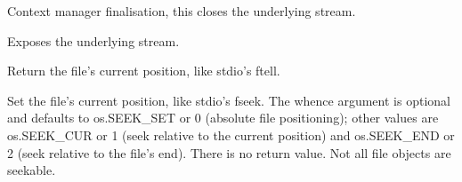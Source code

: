\documentclass[letterpaper,10pt,english]{sphinxmanual}
\begin{document}
\begin{fulllineitems}
\begin{fulllineitems}
\end{fulllineitems}


\begin{fulllineitems}
\label{\detokenize{ref/LIS/core/RawStream:TotalDepth.LIS.core.RawStream.RawStream.__exit__}}
Context manager finalisation, this closes the underlying stream.

\end{fulllineitems}


\begin{fulllineitems}
\label{\detokenize{ref/LIS/core/RawStream:TotalDepth.LIS.core.RawStream.RawStream.stream}}
Exposes the underlying stream.

\end{fulllineitems}


\begin{fulllineitems}
\label{\detokenize{ref/LIS/core/RawStream:TotalDepth.LIS.core.RawStream.RawStream.tell}}
Return the file’s current position, like stdio’s ftell.

\end{fulllineitems}


\begin{fulllineitems}
\label{\detokenize{ref/LIS/core/RawStream:TotalDepth.LIS.core.RawStream.RawStream.seek}}
Set the file’s current position, like stdio’s fseek. The whence
argument is optional and defaults to os.SEEK\_SET or 0 (absolute file
positioning); other values are os.SEEK\_CUR or 1 (seek relative to the
current position) and os.SEEK\_END or 2 (seek relative to the file’s end).
There is no return value.
Not all file objects are seekable.

\end{fulllineitems}



\end{fulllineitems}
\end{document}
